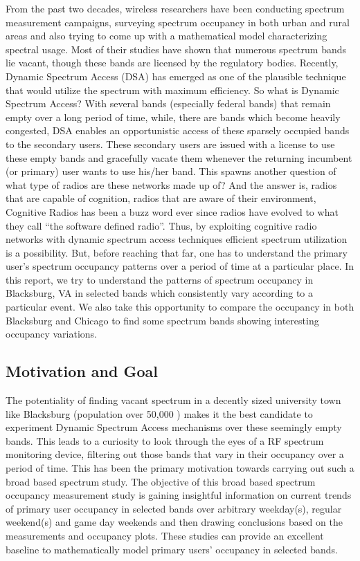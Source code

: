\documentclass[12pt,sts]{report}
\begin{document}
From the past two decades, wireless researchers have been conducting spectrum measurement campaigns, surveying spectrum occupancy in both urban and rural areas and also trying to come up with a mathematical model characterizing spectral usage. Most of their studies have shown that numerous spectrum bands lie vacant, though these bands are licensed by the regulatory bodies. Recently, Dynamic Spectrum Access (DSA) \cite{Akyildiz06nextgeneration/dynamic} has emerged as one of the plausible technique that would utilize the spectrum with maximum efficiency. So what is Dynamic Spectrum Access? With several bands (especially federal bands) that remain empty over a long period of time, while, there are bands which become heavily congested, DSA enables an opportunistic access of these sparsely occupied bands to the secondary users. These secondary users are issued with a license to use these empty bands and gracefully vacate them whenever the returning incumbent (or primary) user wants to use his/her band. This spawns another question of what type of radios are these networks made up of? And the answer is, radios that are capable of cognition, radios that are aware of their environment, Cognitive Radios \cite{Haykin05cognitiveradio} has been a buzz word ever since radios have evolved to what they call ``the software defined radio''. Thus, by exploiting cognitive radio networks with dynamic spectrum access techniques efficient spectrum utilization is a possibility. But, before reaching that far, one has to understand the primary user's spectrum occupancy patterns over a period of time at a particular place. In this report, we try to understand the patterns of spectrum occupancy in Blacksburg, VA in selected bands which consistently vary according to a particular event. We also take this opportunity to compare the occupancy in both Blacksburg and Chicago to find some spectrum bands showing interesting occupancy variations.

	\subsection{Motivation and Goal}
	
	The potentiality of finding vacant spectrum in a decently sized university town like Blacksburg (population over 50,000 \cite{bbDemo}) makes it the best candidate to experiment Dynamic Spectrum Access mechanisms over these seemingly empty bands. This leads to a curiosity to look through the eyes of a RF spectrum monitoring device, filtering out those bands that vary in their occupancy over a period of time. This has been the primary motivation towards carrying out such a broad based spectrum study. The objective of this broad based spectrum occupancy measurement study is gaining insightful information on current trends of primary user occupancy in selected bands over arbitrary weekday(s), regular weekend(s) and game day weekends and then drawing conclusions based on the measurements and occupancy plots. These studies can provide an excellent baseline to mathematically model primary users' occupancy in selected bands.
	
\end{document}
